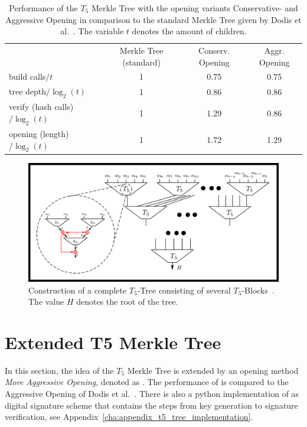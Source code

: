 \begin{table}
\centering
\begin{tabular}{l c c c} 
 \hline\noalign{\smallskip}
 \multicolumn{4}{c}{\textbf{$T_5$ Merkle Tree Performance}} \\
 \hline\noalign{\smallskip}
 & Merkle Tree (standard) & Conserv. Opening &  Aggr. Opening \\
 \hline\noalign{\smallskip}
 build calls$/t$ & 1 & 0.75 & 0.75 \\
 tree depth$/\log_2(t)$ & 1 & 0.86 & 0.86 \\
 verify (hash calls)$/\log_2(t)$ & 1 & 1.29 & 0.86 \\
 opening (length)$/\log_2(t)$ & 1 & 1.72 & 1.29 \\ 
 \hline
\end{tabular}
\caption{Performance of the $T_5$ Merkle Tree with the opening variants Conservative- and Aggressive Opening in comparison to the standard Merkle Tree given by Dodis et al.~\cite{T5_paper}. The variable $t$ denotes the amount of children.}
\label{table:t5_merkletree_dodis_performance}
\end{table}

\begin{figure}
\centering
\includegraphics[]{images/Methods/whole_tree_T5_paper.png}
\caption{Construction of a complete $T_5$-Tree consisting of several $T_5$-Blocks~\cite{T5_paper}. The value $H$ denotes the root of the tree.}
\label{img:t5_complete_tree_paper}
\end{figure}

\section{Extended T5 Merkle Tree}
\label{sec:ext_t5_tree} %
In this section, the idea of the $T_5$ Merkle Tree is extended by an opening method \textit{More Aggressive Opening}, denoted as \textit{\extree}.
The performance of \extree is compared to the Aggressive Opening of Dodis et al.~\cite{T5_paper}. There is also a python implementation of \extree as digital signature scheme that contains the steps from key generation to signature verification, see Appendix~\ref{cha:appendix_t5_tree_implementation}.

